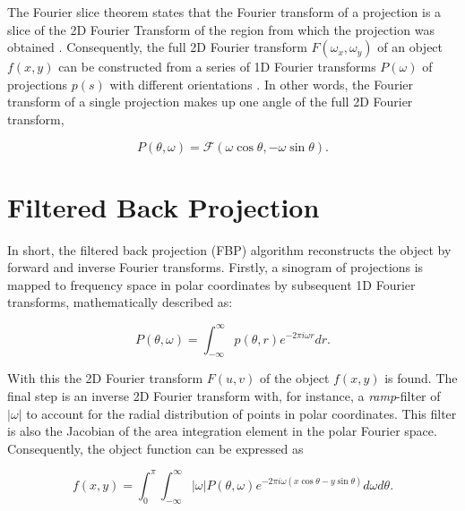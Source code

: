 The Fourier slice theorem states that the Fourier transform of a projection
is a slice of the 2D Fourier Transform of the region from which the projection was obtained \cite{gonzalez2018digital}.
Consequently, the full 2D Fourier transform
$F(\omega_x, \omega_y)$ of an object $f(x,y)$ can be constructed from a series of 1D Fourier transforms
$P(\omega)$ of projections $p(s)$ with different orientations \cite{zeng2010medical}.
In other words, the Fourier transform of a single projection makes up one angle of the full 2D Fourier transform,

\begin{equation}\label{eq:Fourier_slice}
    P(\theta, \omega) = \mathcal{F} \left( \omega \cos \theta, -\omega \sin \theta \right). %
\end{equation}





\section{Filtered Back Projection}
In short, the filtered back projection (FBP) algorithm reconstructs the object by forward and inverse Fourier transforms.
Firstly, a sinogram of projections is mapped to frequency space in polar coordinates by subsequent 1D Fourier transforms, mathematically described as:

\begin{equation}\label{eq:FBP_1}
    P(\theta, \omega) = \int_{-\infty}^{\infty} p(\theta,r)e^{-2\pi i\omega r} dr.
\end{equation}

With this the 2D Fourier transform $F(u,v)$ of the object $f(x,y)$ is found.
The final step is an inverse 2D Fourier transform with, for instance, a \emph{ramp}-filter of $|\omega|$ to account for the radial distribution of points in polar coordinates.
This filter is also the Jacobian of the area integration element in the polar Fourier space.
Consequently, the object function can be expressed as

\begin{equation}
    f(x,y) = \int_{0}^{\pi} \int_{-\infty}^{\infty} \left|\omega\right| P(\theta,\omega)e^{-2\pi i\omega (x\cos\theta - y\sin\theta)} d\omega d\theta.
\end{equation}







